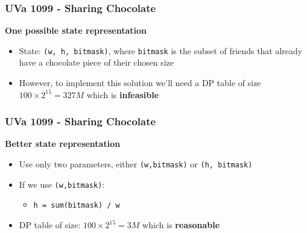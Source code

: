 \documentclass{beamer}
\begin{document}
\begin{frame}[fragile]
\frametitle{UVa 1099 - Sharing Chocolate}

\textbf{One possible state representation}

\vspace{0.3cm}

\begin{itemize}
    \item State: \verb|(w, h, bitmask)|, where \verb|bitmask| is the subset of friends that already have a chocolate piece of their chosen size
	\item However, to implement this solution we'll need a DP table of size $100\times 2^15 = 327M$ which is \textbf{infeasible}
\end{itemize}

\end{frame}

\begin{frame}[fragile]
\frametitle{UVa 1099 - Sharing Chocolate}

\textbf{Better state representation}

\vspace{0.3cm}

\begin{itemize}
    \item Use only two parameters, either \verb|(w,bitmask)| or \verb|(h, bitmask)|
	\pause
	\item If we use \verb|(w,bitmask)|:
	\begin{itemize}
	    \item \verb|h = sum(bitmask) / w|
	\end{itemize}
	
	\pause
	\item DP table of size: $100\times 2^15 = 3M$ which is \textbf{reasonable}
\end{itemize}
\end{frame}
\end{document}
